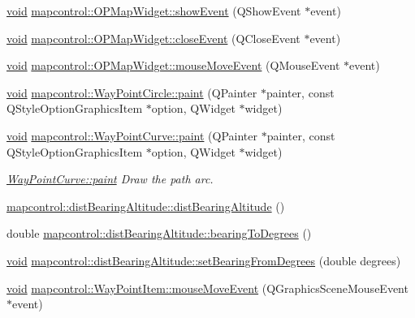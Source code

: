 \begin{DoxyCompactItemize}
\item 
\hyperlink{group___u_a_v_objects_plugin_ga444cf2ff3f0ecbe028adce838d373f5c}{void} \hyperlink{group___o_p_map_widget_gaa02db9787da06fe405061620b80605d4}{mapcontrol\-::\-O\-P\-Map\-Widget\-::show\-Event} (\-Q\-Show\-Event $\ast$event)
\item 
\hyperlink{group___u_a_v_objects_plugin_ga444cf2ff3f0ecbe028adce838d373f5c}{void} \hyperlink{group___o_p_map_widget_gabb098a73bed666626144c0da8332c609}{mapcontrol\-::\-O\-P\-Map\-Widget\-::close\-Event} (\-Q\-Close\-Event $\ast$event)
\item 
\hyperlink{group___u_a_v_objects_plugin_ga444cf2ff3f0ecbe028adce838d373f5c}{void} \hyperlink{group___o_p_map_widget_gaac8f40f4fe29d88750285c003b3f7b3f}{mapcontrol\-::\-O\-P\-Map\-Widget\-::mouse\-Move\-Event} (\-Q\-Mouse\-Event $\ast$event)
\item 
\hyperlink{group___u_a_v_objects_plugin_ga444cf2ff3f0ecbe028adce838d373f5c}{void} \hyperlink{group___o_p_map_widget_ga90e225e45f660d413d4d7ecac9bda3d9}{mapcontrol\-::\-Way\-Point\-Circle\-::paint} (\-Q\-Painter $\ast$painter, const \-Q\-Style\-Option\-Graphics\-Item $\ast$option, \-Q\-Widget $\ast$widget)
\item 
\hyperlink{group___u_a_v_objects_plugin_ga444cf2ff3f0ecbe028adce838d373f5c}{void} \hyperlink{group___o_p_map_widget_gaa2b1fdb88cca171d82b5705989370729}{mapcontrol\-::\-Way\-Point\-Curve\-::paint} (\-Q\-Painter $\ast$painter, const \-Q\-Style\-Option\-Graphics\-Item $\ast$option, \-Q\-Widget $\ast$widget)
\begin{DoxyCompactList}\small\item\em \hyperlink{group___o_p_map_widget_gaa2b1fdb88cca171d82b5705989370729}{\-Way\-Point\-Curve\-::paint} \-Draw the path arc. \end{DoxyCompactList}\item 
\hyperlink{group___o_p_map_widget_ga0ccea3ba9da45c99f65b815917fe7e31}{mapcontrol\-::dist\-Bearing\-Altitude\-::dist\-Bearing\-Altitude} ()
\item 
double \hyperlink{group___o_p_map_widget_ga6c6805690915c378c1d294ebf621a7cf}{mapcontrol\-::dist\-Bearing\-Altitude\-::bearing\-To\-Degrees} ()
\item 
\hyperlink{group___u_a_v_objects_plugin_ga444cf2ff3f0ecbe028adce838d373f5c}{void} \hyperlink{group___o_p_map_widget_gacf717a0d69700f372c04dcee7f550dea}{mapcontrol\-::dist\-Bearing\-Altitude\-::set\-Bearing\-From\-Degrees} (double degrees)
\item 
\hyperlink{group___u_a_v_objects_plugin_ga444cf2ff3f0ecbe028adce838d373f5c}{void} \hyperlink{group___o_p_map_widget_ga6f89cd987bfc43501b2d48b05a98e542}{mapcontrol\-::\-Way\-Point\-Item\-::mouse\-Move\-Event} (\-Q\-Graphics\-Scene\-Mouse\-Event $\ast$event)

\end{DoxyCompactItemize}
